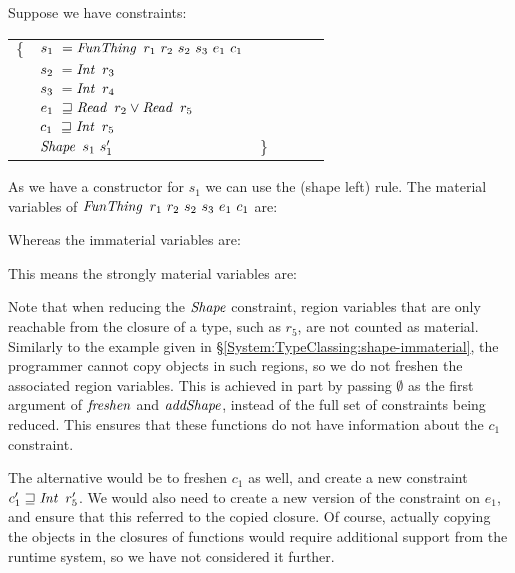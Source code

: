 
Suppose we have constraints: 

\quad\quad\quad
\begin{tabular}{llllll}
	$\{$
	& $s_1 \ = \operatorname{\mathit{FunThing}} \ r_1 \ r_2 \ s_2 \ s_3 \ e_1 \ c_1$ \\
	& $s_2 \ = \iInt \ r_3$ \\
	& $s_3 \ = \iInt \ r_4$ \\
	& $e_1 \ \sqsupseteq \operatorname{\mathit{Read}} \ r_2 \lor \operatorname{\mathit{Read}} \ r_5$ \\
	& $c_1 \ \sqsupseteq \operatorname{\mathit{Int}} \ r_5$ \\
	& $\iShape \ s_1 \ s_1'$ 
	& $\}$
\end{tabular}
\bigskip

As we have a constructor for $s_1$ we can use the (shape left) rule. The material variables of $\iFunThing \ r_1 \ r_2 \ s_2 \ s_3 \ e_1 \ c_1$ are:


Whereas the immaterial variables are:


This means the strongly material variables are:


Note that when reducing the $\operatorname{\mathit{Shape}}$ constraint, region variables that are only reachable from the closure of a type, such as $r_5$, are not counted as material. Similarly to the example given in \S\ref{System:TypeClassing:shape-immaterial}, the programmer cannot copy objects in such regions, so we do not freshen the associated region variables. This is achieved in part by passing $\emptyset$ as the first argument of $\operatorname{\mathit{freshen}}$ and $\operatorname{\mathit{addShape}}$, instead of the full set of constraints being reduced. This ensures that these functions do not have information about the $c_1$ constraint. 

The alternative would be to freshen $c_1$ as well, and create a new constraint $c_1' \sqsupseteq \operatorname{\mathit{Int}} \ r_5'$. We would also need to create a new version of the constraint on $e_1$, and ensure that this referred to the copied closure. Of course, actually copying the objects in the closures of functions would require additional support from the runtime system, so we have not considered it further.

